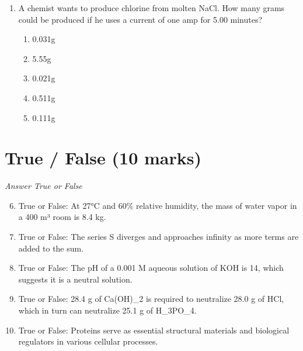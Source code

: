 \documentclass[12pt]{article}
\begin{document}
\begin{enumerate}[label=\arabic*.]
decreasing order of ability as reducing agents: Al, Co, Ni, Ag, H\_2, Na .
\begin{enumerate}[label=(\alph*)]
    \item H\_2 \textgreater{} Ni \textgreater{} Co \textgreater{} Al \textgreater{} Na \textgreater{} Ag
    \item Al \textgreater{} Co \textgreater{} Ni \textgreater{} Ag \textgreater{} H\_2 \textgreater{} Na
    \item Ag \textgreater{} Na \textgreater{} Al \textgreater{} H\_2 \textgreater{} Co \textgreater{} Ni
    \item Ag \textgreater{} H\_2 \textgreater{} Ni \textgreater{} Co \textgreater{} Al \textgreater{} Na
    \item Ni \textgreater{} Co \textgreater{} Al \textgreater{} Na \textgreater{} Ag \textgreater{} H\_2
\end{enumerate}
\item A chemist wants to produce chlorine from molten NaCl. How many grams could be produced if
he uses a current of one amp for 5.00 minutes?
\begin{enumerate}[label=(\alph*)]
    \item 0.031g
    \item 5.55g
    \item 0.021g
    \item 0.511g
    \item 0.111g
\end{enumerate}
\end{enumerate}

\section*{True / False (10 marks)}
\textit{Answer True or False}
\begin{enumerate}[label=\arabic*.]
\setcounter{enumi}{5}
\item True or False: At 27°C and 60\% relative humidity, the mass of water vapor in a 400 m³ room is 8.4 kg.
\item True or False: The series S diverges and approaches infinity as more terms are added to the sum.
\item True or False: The pH of a 0.001 M aqueous solution of KOH is 14, which suggests it is a neutral solution.
\item True or False: 28.4 g of Ca(OH)\_2 is required to neutralize 28.0 g of HCl, which in turn can neutralize 25.1 g of H\_3PO\_4.
\item True or False: Proteins serve as essential structural materials and biological regulators in various cellular processes.
\end{enumerate}
\end{document}
